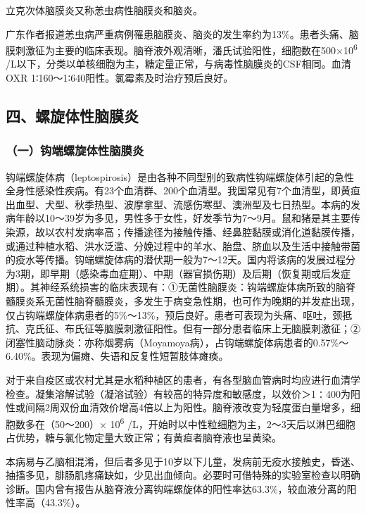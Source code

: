 立克次体脑膜炎又称恙虫病性脑膜炎和脑炎。

广东作者报道恙虫病严重病例罹患脑膜炎、脑炎的发生率约为13\%。患者头痛、脑膜刺激征为主要的临床表现。脑脊液外观清晰，潘氏试验阳性，细胞数在500×10\textsuperscript{6}
/L以下，分类以单核细胞为主，糖定量正常，与病毒性脑膜炎的CSF相同。血清OXR
1∶160～1∶640阳性。氯霉素及时治疗预后良好。

\protect\hypertarget{text00387.html}{}{}

\subsection{四、螺旋体性脑膜炎}

\subsubsection{（一）钩端螺旋体性脑膜炎}

钩端螺旋体病（leptospirosis）是由各种不同型别的致病性钩端螺旋体引起的急性全身性感染性疾病。有23个血清群、200个血清型。我国常见有7个血清型，即黄疸出血型、犬型、秋季热型、波摩拿型、流感伤寒型、澳洲型及七日热型。本病的发病年龄以10～39岁为多见，男性多于女性，好发季节为7～9月。鼠和猪是其主要传染源，故以农村发病率高；传播途径为接触传播、经鼻腔黏膜或消化道黏膜传播，或通过种植水稻、洪水泛滥、分娩过程中的羊水、胎盘、脐血以及生活中接触带菌的疫水等传播。钩端螺旋体病的潜伏期一般为7～12天。国内将该病的发展过程分为3期，即早期（感染毒血症期）、中期（器官损伤期）及后期（恢复期或后发症期）。其神经系统损害的临床表现有：①无菌性脑膜炎：钩端螺旋体病所致的脑脊髓膜炎系无菌性脑脊髓膜炎，多发生于病变急性期，也可作为晚期的并发症出现，仅占钩端螺旋体病患者的5\%～13\%，预后良好。患者可表现为头痛、呕吐，颈抵抗、克氏征、布氏征等脑膜刺激征阳性。但有一部分患者临床上无脑膜刺激征；②闭塞性脑动脉炎：亦称烟雾病（Moyamoya病），占钩端螺旋体病患者的0.57\%～6.40\%。表现为偏瘫、失语和反复性短暂肢体瘫痪。

对于来自疫区或农村尤其是水稻种植区的患者，有各型脑血管病时均应进行血清学检查。凝集溶解试验（凝溶试验）有较高的特异度和敏感度，以效价＞1∶400为阳性或间隔2周双份血清效价增高4倍以上为阳性。脑脊液改变为轻度蛋白量增多，细胞数多在（50～200）×
10\textsuperscript{6}
/L，开始时以中性粒细胞为主，2～3天后以淋巴细胞占优势，糖与氯化物定量大致正常；有黄疸者脑脊液也呈黄染。

本病易与乙脑相混淆，但后者多见于10岁以下儿童，发病前无疫水接触史，昏迷、抽搐多见，腓肠肌疼痛缺如，少见出血倾向。必要时可借特殊的实验室检查以明确诊断。国内曾有报告从脑脊液分离钩端螺旋体的阳性率达63.3\%，较血液分离的阳性率高（43.3\%）。

